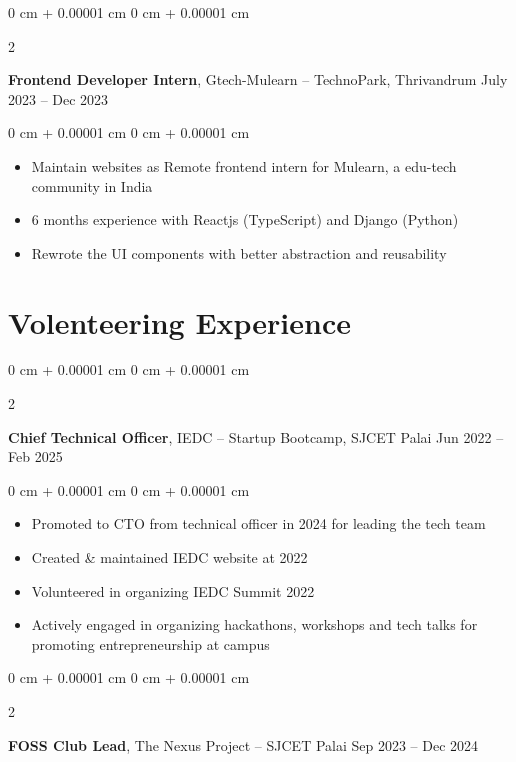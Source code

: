 \documentclass[10pt, letterpaper]{article}
\newenvironment{highlights}{
    \begin{itemize}[
        topsep=0.10 cm,
        parsep=0.10 cm,
        partopsep=0pt,
        itemsep=0pt,
        leftmargin=0 cm + 10pt
    ]
}{
    \end{itemize}
} %
\newenvironment{onecolentry}{
    \begin{adjustwidth}{
        0 cm + 0.00001 cm
    }{
        0 cm + 0.00001 cm
    }
}{
    \end{adjustwidth}
} %
\newenvironment{twocolentry}[2][]{
    \onecolentry
    \def\secondColumn{#2}
    \setcolumnwidth{\fill, 4.5 cm}
    \begin{paracol}{2}
}{
    \switchcolumn \raggedleft \secondColumn
    \end{paracol}
    \endonecolentry
} %
\begin{document}
\begin{twocolentry}{
		July 2023 – Dec 2023
	}
	\textbf{Frontend Developer Intern}, Gtech-Mulearn -- TechnoPark, Thrivandrum\end{twocolentry}

\vspace{0.10 cm}
\begin{onecolentry}
	\begin{highlights}
		\item Maintain websites as Remote frontend intern for Mulearn, a edu-tech community
		in India
		\item 6 months experience with Reactjs (TypeScript) and Django (Python)
		\item Rewrote the UI components with better abstraction and reusability
	\end{highlights}
\end{onecolentry}

\vspace{0.2 cm}

\section{Volenteering Experience}

\begin{twocolentry}{
		Jun 2022 – Feb 2025
	}
	\textbf{Chief Technical Officer}, IEDC -- Startup Bootcamp, SJCET Palai\end{twocolentry}

\vspace{0.10 cm}
\begin{onecolentry}
	\begin{highlights}
		\item Promoted to CTO from technical officer in 2024 for leading the tech team
		\item Created \& maintained IEDC website at 2022
		\item Volunteered in organizing IEDC Summit 2022
		\item Actively engaged in organizing hackathons, workshops and tech talks for
		promoting entrepreneurship at campus
	\end{highlights}
\end{onecolentry}

\vspace{0.2 cm}

\begin{twocolentry}{
		Sep 2023 – Dec 2024
	}
	\textbf{FOSS Club Lead}, The Nexus Project -- SJCET Palai\end{twocolentry}
\end{document}
